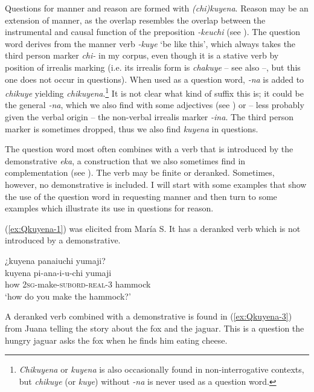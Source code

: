 Questions for manner and reason are formed with \textit{(chi)kuyena}. Reason may be an extension of manner, as the overlap resembles the overlap between the instrumental and causal function of the preposition \textit{-keuchi} (see ). The question word derives from the manner verb \textit{-kuye} ‘be like this’, which always takes the third person marker \textit{chi-} in my corpus, even though it is a stative verb by position of irrealis marking (i.e. its irrealis form is \textit{chakuye} – see also  –, but this one does not occur in questions). When used as a question word, \textit{-na} is added to \textit{chikuye} yielding \textit{chikuyena}.\footnote{\textit{Chikuyena} or \textit{kuyena} is also occasionally found in non-interrogative contexts, but \textit{chikuye} (or \textit{kuye}) without \textit{-na} is never used as a question word.} It is not clear what kind of suffix this is; it could be the general  \textit{-na}, which we also find with some adjectives (see ) or – less probably given the verbal origin – the non-verbal irrealis marker \textit{-ina}. The third person marker is sometimes dropped, thus we also find \textit{kuyena} in questions. 


The question word most often combines with a verb that is introduced by the demonstrative \textit{eka}, a construction that we also sometimes find in complementation (see ). The verb may be finite or deranked. Sometimes, however, no demonstrative is included.  I will start with some examples that show the use of the question word in requesting manner and then turn to some examples which illustrate its use in questions for reason.

(\ref{ex:Qkuyena-1}) was elicited from María S. It has a deranked verb which is not introduced by a demonstrative.


\ea\label{ex:Qkuyena-1}
\begingl
\glpreamble ¿kuyena panaiuchi yumaji?\\
\gla kuyena pi-ana-i-u-chi yumaji\\
\glb how 2\textsc{sg}-make-\textsc{subord}-\textsc{real}-3 hammock\\
\glft ‘how do you make the hammock?’
\endgl
\trailingcitation{[rxx-e181022le]}
\xe

A deranked verb combined with a demonstrative is found in (\ref{ex:Qkuyena-3}) from Juana telling the story about the fox and the jaguar. This is a question the hungry jaguar asks the fox when he finds him eating cheese.


